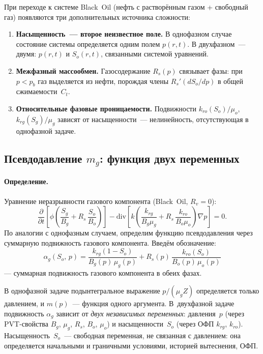 \documentclass[12pt,a4paper]{article}
\begin{document}
При переходе к системе Black~Oil (нефть с растворённым газом +
свободный газ) появляются три дополнительных источника сложности:

\begin{enumerate}
  \item \textbf{Насыщенность~--- второе неизвестное поле.}
        В однофазном случае состояние системы определяется
        одним полем $p(r,t)$. В двухфазном~--- двумя:
        $p(r,t)$ и $S_o(r,t)$, связанными системой уравнений.

  \item \textbf{Межфазный массообмен.}
        Газосодержание $R_s(p)$ связывает фазы:
        при $p < p_b$ газ выделяется из нефти, порождая
        члены $R_s'(dS_o/dp)$ в общей сжимаемости~$C_t$.

  \item \textbf{Относительные фазовые проницаемости.}
        Подвижности $k_{ro}(S_o)/\mu_o$, $k_{rg}(S_g)/\mu_g$
        зависят от насыщенности~--- нелинейность,
        отсутствующая в однофазной задаче.
\end{enumerate}

\subsection{Псевдодавление $m_g$: функция двух переменных}

\paragraph{Определение.}
Уравнение неразрывности газового компонента (Black~Oil, $R_v=0$):
\begin{equation}\label{eq:gas_cont}
  \frac{\partial}{\partial t}\left[\phi\left(\frac{S_g}{B_g}
  + R_s\,\frac{S_o}{B_o}\right)\right]
  - \mathrm{div}\left[k\left(\frac{k_{rg}}{B_g\mu_g}
  + R_s\,\frac{k_{ro}}{B_o\mu_o}\right)\nabla p\right] = 0.
\end{equation}
По аналогии с однофазным случаем, определим функцию
псевдодавления через суммарную подвижность газового
компонента. Введём обозначение:
\begin{equation}\label{eq:alpha_def}
  \alpha_g(S_o,\,p) = \frac{k_{rg}(1-S_o)}{B_g(p)\,\mu_g(p)}
  + R_s(p)\,\frac{k_{ro}(S_o)}{B_o(p)\,\mu_o(p)}
\end{equation}
--- суммарная подвижность газового компонента в обеих фазах.

В однофазной задаче подынтегральное выражение
$p/(\mu_g Z)$ определяется только давлением,
и $m(p)$~--- функция одного аргумента.
В~двухфазной задаче подвижность $\alpha_g$ зависит
от \emph{двух независимых переменных}: давления~$p$
(через PVT-свойства $B_g$, $\mu_g$, $R_s$, $B_o$, $\mu_o$)
и насыщенности~$S_o$ (через ОФП $k_{rg}$, $k_{ro}$).
Насыщенность~$S_o$~--- свободная переменная, не связанная
с давлением: она определяется начальными и граничными
условиями, историей вытеснения, ОФП.
\end{document}
